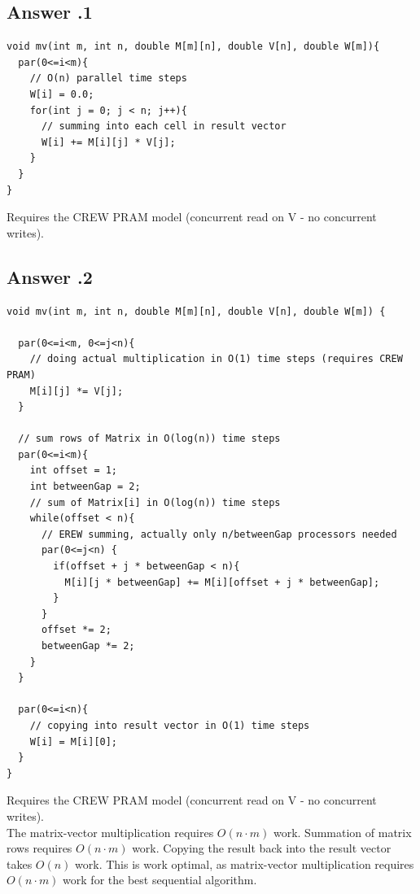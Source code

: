 \documentclass[a4paper,%
11pt,%
DIV=12,
headsepline,%
headings=normal,
]{scrartcl}
\newcounter{curex}
\newcommand{\answer}[1]{\subsection*{Answer \arabic{curex}.#1}}
\begin{document}
\answer{1}
\begin{minipage}[t]{1.0\linewidth}
\begin{lstlisting}
void mv(int m, int n, double M[m][n], double V[n], double W[m]){
  par(0<=i<m){
  	// O(n) parallel time steps
    W[i] = 0.0;
    for(int j = 0; j < n; j++){
      // summing into each cell in result vector 
      W[i] += M[i][j] * V[j];
    }
  }
}
\end{lstlisting}
\end{minipage}
Requires the CREW PRAM model (concurrent read on V - no concurrent writes).

\answer{2}
\begin{minipage}[t]{1.0\linewidth}
\begin{lstlisting}
void mv(int m, int n, double M[m][n], double V[n], double W[m]) {
  
  par(0<=i<m, 0<=j<n){
    // doing actual multiplication in O(1) time steps (requires CREW PRAM)
    M[i][j] *= V[j];
  }

  // sum rows of Matrix in O(log(n)) time steps
  par(0<=i<m){
    int offset = 1;
    int betweenGap = 2;
    // sum of Matrix[i] in O(log(n)) time steps
    while(offset < n){
      // EREW summing, actually only n/betweenGap processors needed
      par(0<=j<n) {
        if(offset + j * betweenGap < n){
          M[i][j * betweenGap] += M[i][offset + j * betweenGap];
        }
      }
      offset *= 2;
      betweenGap *= 2;
    }
  }
  
  par(0<=i<n){
    // copying into result vector in O(1) time steps
    W[i] = M[i][0];
  }
}
\end{lstlisting}
\end{minipage}
Requires the CREW PRAM model (concurrent read on V - no concurrent writes). \\
The matrix-vector multiplication requires $O(n \cdot m)$ work. Summation of matrix rows requires $O(n \cdot m)$ work. Copying the result back into the result vector takes $O(n)$ work. This is work optimal, as matrix-vector multiplication requires  $O(n \cdot m)$ work for the best sequential algorithm.
\end{document}

